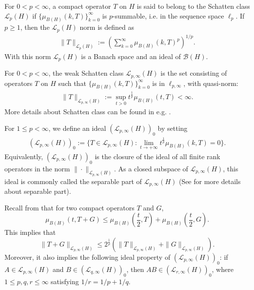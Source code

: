 \documentclass{amsart}
\begin{document}
For $0<p<\infty$, a compact operator $T$ on $H$ is said to belong to the Schatten class $\mathcal{L}_{p}(H)$ if $\{\mu_{B(H)}(k,T)\}_{k=0}^{\infty}$ is $p$-summable, i.e. in the sequence space $\ell_{p}$. If $p\geq 1$, then the $\mathcal{L}_{p}(H)$ norm is defined as
\begin{align*}
\|T\|_{\mathcal{L}_{p}(H)}:=\left(\sum_{k=0}^{\infty}\mu_{B(H)}(k,T)^{p}\right)^{1/p}.
\end{align*}
With this norm $\mathcal{L}_p(H)$ is a Banach space and an ideal of $\mathcal{B}(H)$.

For $0<p<\infty$, the weak Schatten class $\mathcal{L}_{p,\infty}(H)$ is the set consisting of operators $T$ on $H$ such that $\{\mu_{B(H)}(k,T)\}_{k=0}^{\infty}$ is in $\ell_{p,\infty}$, with quasi-norm:
\begin{align*}
\|T\|_{\mathcal{L}_{p,\infty}(H)}:=\sup\limits_{t>0}t^{\frac 1p}\mu_{B(H)}(t,T)<\infty.
\end{align*}
More details about Schatten class can be found in e.g. \cite{LSZold,LSZ1}.

For $1\leq p <\infty$, we define an ideal $(\mathcal{L}_{p,\infty}(H))_{0}$ by setting
\begin{align*}
(\mathcal{L}_{p,\infty}(H))_{0}:=\{T \in \mathcal{L}_{p,\infty}(H)   :  \lim_{t\to +\infty} t^{\frac 1p} \mu_{B(H)}(k,T) = 0 \}.
\end{align*}
Equivalently, $(\mathcal{L}_{p,\infty}(H))_{0}$ is the closure of the ideal of all finite rank operators in the norm $\|\cdot\|_{\mathcal{L}_{p,\infty}(H)}$.
As a closed subspace of $\mathcal{L}_{p,\infty}(H)$, this ideal is commonly called the separable part of $\mathcal{L}_{p,\infty}(H)$ (See \cite{LSZold,LSZ1} for more details about separable part).

Recall from \cite[Corollary 2.3.16]{LSZold} that for two compact operators $T$ and $G$,
$$\mu_{B(H)}(t,T+G)\leq \mu_{B(H)}(\frac t2,T)+\mu_{B(H)}(\frac t2,G).$$
This implies that
$$\|T+G\|_{\mathcal{L}_{p,\infty}(H)}\leq 2^{\frac1p}(\|T\|_{\mathcal{L}_{p,\infty}(H)}+\|G\|_{\mathcal{L}_{p,\infty}(H)}).$$
Moreover, it also implies the following ideal property of $(\mathcal{L}_{p,\infty}(H))_0$: if $A\in \mathcal{L}_{p,\infty}(H)$ and $B\in (\mathcal{L}_{q,\infty}(H))_0$, then $AB\in (\mathcal{L}_{r,\infty}(H))_{0}$, where $1\leq p,q,r\leq\infty$ satisfying $1/r=1/p+1/q$.
\end{document}
